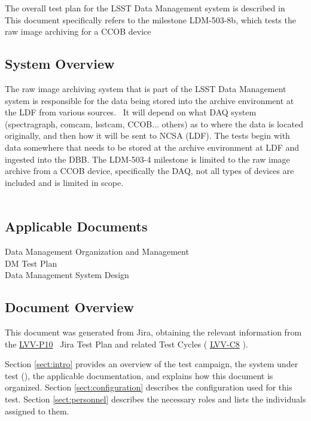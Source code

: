 \documentclass[DM,lsstdraft,STR,toc]{lsstdoc}
\begin{document}
The overall test plan for the LSST Data Management system is described
in \\
This document specifically refers to the milestone LDM-503-8b, which
tests the raw image archiving for a CCOB device



\subsection{System Overview}
\label{sect:systemoverview}

The raw image archiving system that is part of the LSST Data Management
system is responsible for the data being stored into the archive
environment at the LDF from various sources. ~It will depend on what DAQ
system (spectragraph, comcam, lsstcam, CCOB... others) as to where the
data is located originally, and then how it will be sent to NCSA (LDF).
The tests begin with data somewhere that needs to be stored at the
archive environment at LDF and ingested into the DBB. The LDM-503-4
milestone is limited to the raw image archive from a CCOB device,
specifically the DAQ, not all types of devices are included and is
limited in scope.\\
~\\

\hypertarget{applicable-documents}{%
\subsection{Applicable Documents}\label{applicable-documents}}

 Data Management Organization and Management\\
 DM Test Plan\\
 Data Management System Design


\subsection{Document Overview}
\label{sect:docoverview}

This document was generated from Jira, obtaining the relevant information from the 
\href{https://jira.lsstcorp.org/secure/Tests.jspa#/testPlan/LVV-P10}{LVV-P10}
~Jira Test Plan and related Test Cycles (
  \href{https://jira.lsstcorp.org/secure/Tests.jspa#/testCycle/LVV-C8}{LVV-C8}
).

Section \ref{sect:intro} provides an overview of the test campaign, the system under test (\product{}), the applicable documentation, and explains how this document is organized.
Section \ref{sect:configuration}  describes the configuration used for this test.
Section \ref{sect:personnel} describes the necessary roles and lists the individuals assigned to them.
\end{document}
